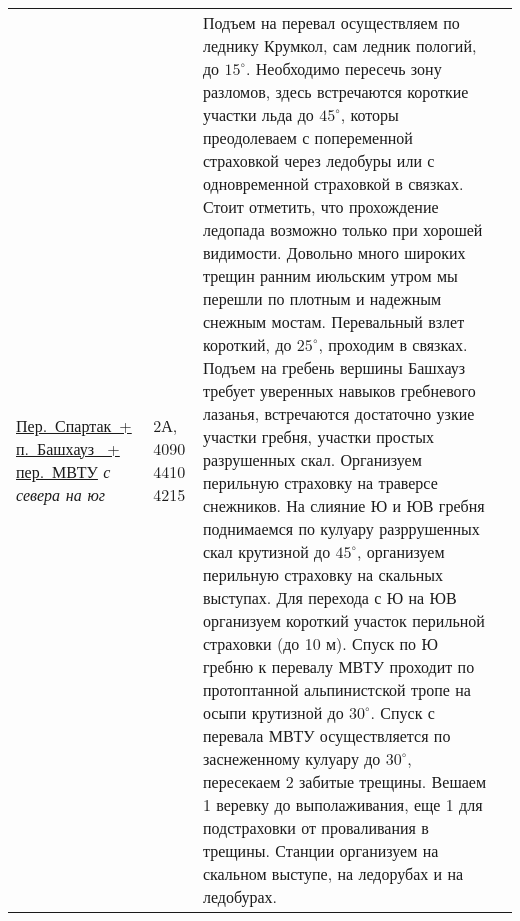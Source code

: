 {\begin{longtable}{|>{\centering\arraybackslash}m{4.5cm}|>{\centering\arraybackslash}m{1.8cm}|>{\raggedright\arraybackslash}m{9.6cm}|>{\centering\arraybackslash}m{1.2cm}|}
{		 	\textbf{Вывод:} Связка пер. Туристов Грузии + пер. Ашинова соответствуют 1Б категории сложности. Эти препятствия целесообразно включать в походы от 3 к.с. Перевалы также подходят для акклиматизации и позволяют вспомнить навыки движения по некрутому снегу, в кошках, движение в связках.}																												&			\\ \hline
			\hyperref[subsec:Day6]{{\small Пер.~Спартак~+ п.~Башхауз~ + пер.~МВТУ}}										\newline\textit{с севера на юг}			&	2А, 4090 4410 4215			&	{\small Подъем на перевал осуществляем по леднику Крумкол, сам ледник пологий, до $15^\circ$. Необходимо пересечь зону разломов, здесь встречаются короткие участки льда до $45^\circ$, которы преодолеваем с попеременной страховкой через ледобуры или с одновременной страховкой в связках. Стоит отметить, что прохождение ледопада возможно только при хорошей видимости. Довольно много широких трещин ранним июльским утром мы перешли по плотным и надежным снежным мостам. Перевальный взлет короткий, до $25^\circ$, проходим в связках. Подъем на гребень вершины Башхауз требует уверенных навыков гребневого лазанья, встречаются достаточно узкие участки гребня, участки простых разрушенных скал. Организуем перильную страховку на траверсе снежников. На слияние Ю и ЮВ гребня поднимаемся по кулуару разррушенных скал крутизной до $45^\circ$, организуем перильную страховку на скальных выступах. Для перехода с Ю на ЮВ организуем короткий участок перильной страховки (до 10 м). Спуск по Ю гребню к перевалу МВТУ проходит по протоптанной альпинистской тропе на осыпи крутизной до $30^\circ$. Спуск с перевала МВТУ осуществляется по заснеженному кулуару до $30^\circ$, пересекаем 2 забитые трещины. Вешаем 1 веревку до выполаживания, еще 1 для подстраховки от проваливания в трещины. Станции организуем на скальном выступе, на ледорубах и на ледобурах.
			
}
\end{longtable}}
